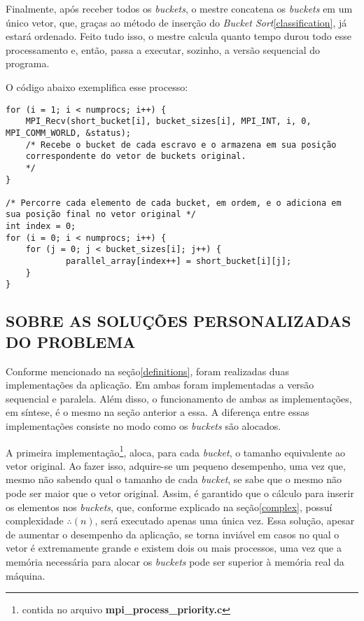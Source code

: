			Finalmente, após receber todos os \textit{buckets}, o mestre concatena os \textit{buckets} em um único vetor, que, graças ao método de inserção do \textit{Bucket Sort}\ref{classification}, já estará ordenado. Feito tudo isso, o mestre calcula quanto tempo durou todo esse processamento e, então, passa a executar, sozinho, a versão sequencial do programa.
			
			O código abaixo exemplifica esse processo:
			\begin{lstlisting}[style=C]
for (i = 1; i < numprocs; i++) {
	MPI_Recv(short_bucket[i], bucket_sizes[i], MPI_INT, i, 0, MPI_COMM_WORLD, &status);
	/* Recebe o bucket de cada escravo e o armazena em sua posição 
	correspondente do vetor de buckets original.
	*/
}

/* Percorre cada elemento de cada bucket, em ordem, e o adiciona em sua posição final no vetor original */
int index = 0;
for (i = 0; i < numprocs; i++) {
	for (j = 0; j < bucket_sizes[i]; j++) {
    		parallel_array[index++] = short_bucket[i][j];
	}
}
\end{lstlisting}

	\subsection{\normalsize SOBRE AS SOLUÇÕES PERSONALIZADAS DO PROBLEMA}\label{personal}
		Conforme mencionado na seção\ref{definitions}, foram realizadas duas implementações da aplicação. Em ambas foram implementadas a versão sequencial e paralela. Além disso, o funcionamento de ambas as implementações, em síntese, é o mesmo na seção anterior a essa. A diferença entre essas implementações consiste no modo como os \textit{buckets} são alocados.
		
		A primeira implementação\footnote{contida no arquivo \textbf{mpi\_process\_priority.c}}, aloca, para cada \textit{bucket}, o tamanho equivalente ao vetor original. Ao fazer isso, adquire-se um pequeno desempenho, uma vez que, mesmo não sabendo qual o tamanho de cada \textit{bucket}, se sabe que o mesmo não pode ser maior que o vetor original. Assim, é garantido que o cálculo para inserir os elementos nos \textit{buckets}, que, conforme explicado na seção\ref{complex}, possuí complexidade  $\therefore(n)$, será executado apenas uma única vez. Essa solução, apesar de aumentar o desempenho da aplicação, se torna inviável em casos no qual o vetor é extremamente grande e existem dois ou mais processos, uma vez que a memória necessária para alocar os \textit{buckets} pode ser superior à memória real da máquina.
		
